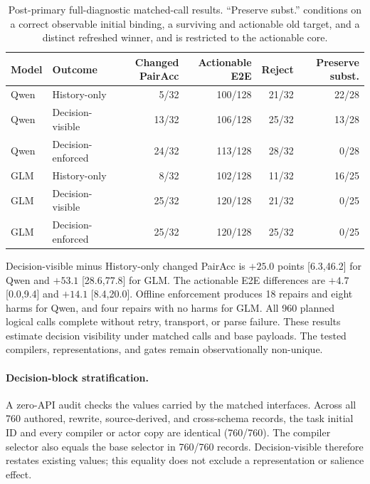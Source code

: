 \documentclass[10pt]{article}
\begin{document}
\begin{table}[H]
\centering
\small
\begin{tabular}{llrrrr}
\toprule
Model & Outcome & Changed PairAcc & Actionable E2E & Reject & Preserve subst. \\
\midrule
Qwen & History-only & 5/32 & 100/128 & 21/32 & 22/28 \\
Qwen & Decision-visible & 13/32 & 106/128 & 25/32 & 13/28 \\
Qwen & Decision-enforced & 24/32 & 113/128 & 28/32 & 0/28 \\
GLM & History-only & 8/32 & 102/128 & 11/32 & 16/25 \\
GLM & Decision-visible & 25/32 & 120/128 & 21/32 & 0/25 \\
GLM & Decision-enforced & 25/32 & 120/128 & 25/32 & 0/25 \\
\bottomrule
\end{tabular}
\caption{Post-primary full-diagnostic matched-call results. ``Preserve subst.'' conditions on a
correct observable initial binding, a surviving and actionable old target, and a distinct refreshed
winner, and is restricted to the actionable core.}
\label{tab:supp-full-matched-confirmation}
\end{table}

Decision-visible minus History-only changed PairAcc is $+25.0$ points [6.3,46.2] for Qwen and
$+53.1$ [28.6,77.8] for GLM. The actionable E2E differences are $+4.7$ [0.0,9.4] and
$+14.1$ [8.4,20.0]. Offline enforcement produces 18 repairs and eight harms for Qwen, and four
repairs with no harms for GLM. All 960 planned logical calls complete without retry, transport,
or parse failure. These results estimate decision visibility under matched calls and base payloads.
The tested compilers, representations, and gates remain observationally non-unique.


\paragraph{Decision-block stratification.}
A zero-API audit checks the values carried by the matched interfaces. Across all 760 authored,
rewrite, source-derived, and cross-schema records, the task initial ID and every compiler or actor
copy are identical (760/760). The compiler selector also equals the base selector in 760/760
records. Decision-visible therefore restates existing values; this equality does not exclude a
representation or salience effect.
\end{document}
